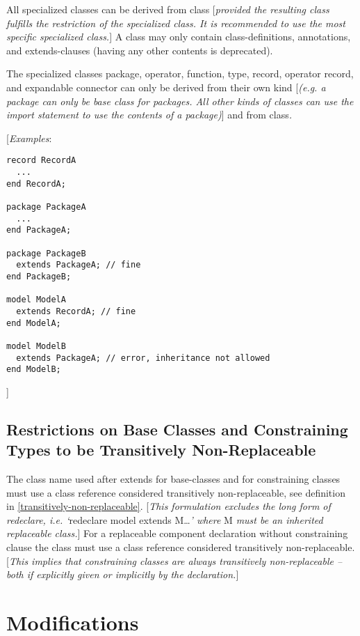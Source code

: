 All specialized classes can be derived from class {[}\emph{provided the
resulting class fulfills the restriction of the specialized class. It is
recommended to use the most specific specialized class.}{]} A class may
only contain class-definitions, annotations, and extends-clauses (having
any other contents is deprecated).

The specialized classes package, operator, function, type, record,
operator record, and expandable connector can only be derived from their
own kind {[}\emph{(e.g. a package can only be base class for packages.
All other kinds of classes can use the import statement to use the
contents of a package)}{]} and from class\emph{.}

{[}\emph{Examples}:
\begin{lstlisting}[language=modelica]
record RecordA
  ...
end RecordA;

package PackageA
  ...
end PackageA;

package PackageB
  extends PackageA; // fine
end PackageB;

model ModelA
  extends RecordA; // fine
end ModelA;

model ModelB
  extends PackageA; // error, inheritance not allowed
end ModelB;
\end{lstlisting}
{]}

\subsection{Restrictions on Base Classes and Constraining Types to be Transitively Non-Replaceable}

The class name used after extends for base-classes and for constraining
classes must use a class reference considered transitively
non-replaceable, see definition in \ref{transitively-non-replaceable}. {[}\emph{This
formulation excludes the long form of redeclare, i.e. `}redeclare model
extends M\ldots{}\emph{' where} M \emph{must be an inherited replaceable
class.}{]} For a replaceable component declaration without constraining
clause the class must use a class reference considered transitively
non-replaceable. {[}\emph{This implies that constraining classes are
always transitively non-replaceable -- both if explicitly given or
implicitly by the declaration.}{]}

\section{Modifications}

